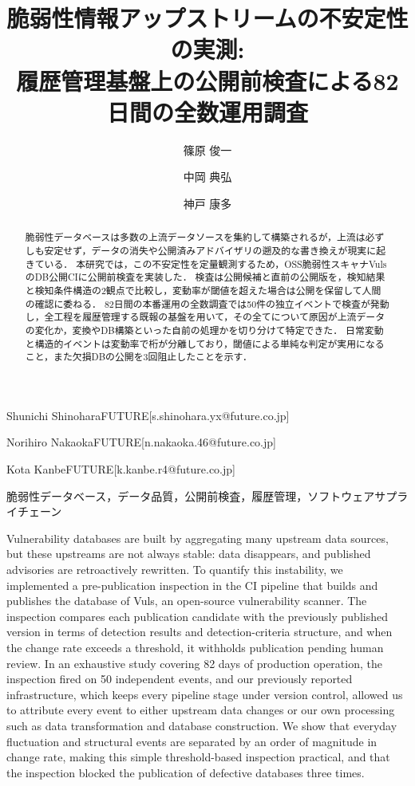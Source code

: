 \documentclass{css}
\begin{document}

\title{脆弱性情報アップストリームの不安定性の実測: \\ 履歴管理基盤上の公開前検査による82日間の全数運用調査}


\author{篠原 俊一}{Shunichi Shinohara}{FUTURE}[s.shinohara.yx@future.co.jp]
\author{中岡 典弘}{Norihiro Nakaoka}{FUTURE}[n.nakaoka.46@future.co.jp]
\author{神戸 康多}{Kota Kanbe}{FUTURE}[k.kanbe.r4@future.co.jp]

\begin{abstract}
脆弱性データベースは多数の上流データソースを集約して構築されるが，上流は必ずしも安定せず，データの消失や公開済みアドバイザリの遡及的な書き換えが現実に起きている．
本研究では，この不安定性を定量観測するため，OSS脆弱性スキャナVulsのDB公開CIに公開前検査を実装した．
検査は公開候補と直前の公開版を，検知結果と検知条件構造の2観点で比較し，変動率が閾値を超えた場合は公開を保留して人間の確認に委ねる．
82日間の本番運用の全数調査では50件の独立イベントで検査が発動し，全工程を履歴管理する既報の基盤を用いて，その全てについて原因が上流データの変化か，変換やDB構築といった自前の処理かを切り分けて特定できた．
日常変動と構造的イベントは変動率で桁が分離しており，閾値による単純な判定が実用になること，また欠損DBの公開を3回阻止したことを示す．
\end{abstract}

\begin{jkeyword}
脆弱性データベース，データ品質，公開前検査，履歴管理，ソフトウェアサプライチェーン
\end{jkeyword}

\begin{eabstract}
Vulnerability databases are built by aggregating many upstream data sources, but these upstreams are not always stable: data disappears, and published advisories are retroactively rewritten.
To quantify this instability, we implemented a pre-publication inspection in the CI pipeline that builds and publishes the database of Vuls, an open-source vulnerability scanner.
The inspection compares each publication candidate with the previously published version in terms of detection results and detection-criteria structure, and when the change rate exceeds a threshold, it withholds publication pending human review.
In an exhaustive study covering 82 days of production operation, the inspection fired on 50 independent events, and our previously reported infrastructure, which keeps every pipeline stage under version control, allowed us to attribute every event to either upstream data changes or our own processing such as data transformation and database construction.
We show that everyday fluctuation and structural events are separated by an order of magnitude in change rate, making this simple threshold-based inspection practical, and that the inspection blocked the publication of defective databases three times.
\end{eabstract}
\end{document}
